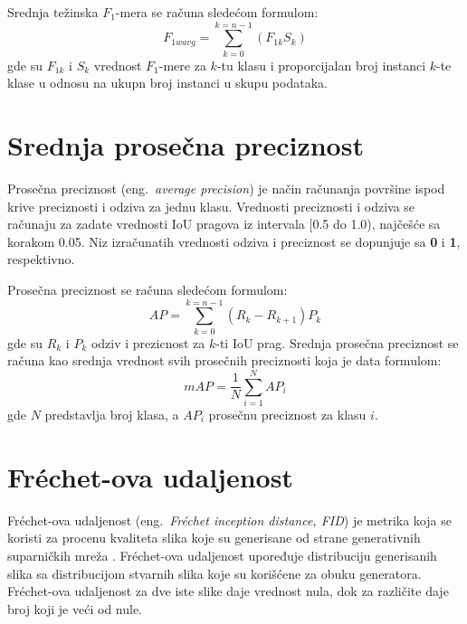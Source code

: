 \documentclass[12pt,oneside]{memoir}
\begin{document}
Srednja težinska $F_1$-mera se računa sledećom formulom:
\begin{equation}
\label{eq:f1wa}
    F_{1wavg} = \sum_{k=0}^{k=n-1} (F_{1k} S_{k})
\end{equation}
gde su \(F_{1k}\) i \(S_{k}\) vrednost $F_1$-mere za \(k\)-tu klasu i proporcijalan broj instanci \(k\)-te klase u odnosu na ukupn broj instanci u skupu podataka.

\section{Srednja prosečna preciznost}
\label{section4_avgprecision}

Prosečna preciznost (eng.~\textit{average precision}) je način računanja površine ispod krive preciznosti i odziva za jednu klasu. Vrednosti preciznosti i odziva se računaju za zadate vrednosti IoU pragova iz intervala [0.5 do 1.0), najčešće sa korakom 0.05.
Niz izračunatih vrednosti odziva i preciznost se dopunjuje sa \textbf{0} i \textbf{1}, respektivno. 


Prosečna preciznost se računa sledećom formulom:
\begin{equation}
\label{eq:ap}
    AP = \sum_{k=0}^{k=n-1} (R_{k} - R_{k+1})P_{k}
\end{equation}
gde su \(R_{k}\) i \(P_{k}\) odziv i prezicnost za \(k\)-ti IoU prag.
Srednja prosečna preciznost se računa kao srednja vrednost svih prosečnih preciznosti koja je data formulom:
\begin{equation}
\label{eq:map}
    mAP =\frac{1}{N} \sum_{i=1}^{N} AP_{i}
\end{equation}
gde \(N\) predstavlja broj klasa, a \(AP_{i}\) prosečnu preciznost za klasu 
\(i\).

\section{Fréchet-ova udaljenost}

Fréchet-ova udaljenost (eng.~\textit{Fréchet inception distance, FID}) je metrika koja se koristi za procenu kvaliteta slika koje su generisane od strane generativnih suparničkih mreža \cite{heusel2017gans}. Fréchet-ova udaljenost upoređuje distribuciju generisanih slika sa distribucijom stvarnih slika koje su korišćene za obuku generatora. Fréchet-ova udaljenost za dve iste slike daje vrednost nula, dok za različite daje broj koji je veći od nule.  
\end{document}

